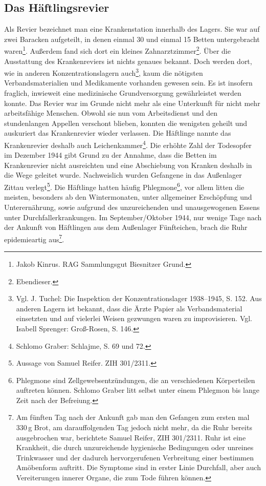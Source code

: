 \documentclass[a4paper,12pt,ngerman,
]{nisebook}
\begin{document}
\subsection{Das Häftlingsrevier}
\label{krank}
Als Revier bezeichnet man eine Krankenstation innerhalb des Lagers. Sie war auf zwei Baracken aufgeteilt, in denen einmal 30 und einmal 15 Betten untergebracht waren\footnote{Jakob Kinrus. RAG Sammlungsgut Biesnitzer Grund.}. Außerdem fand sich dort ein kleines Zahnarztzimmer\footnote{Ebendieser.}. Über die Ausstattung des Krankenreviers ist nichts genaues bekannt. Doch werden dort, wie in anderen Konzentrationslagern auch\footnote{Vgl. J. Tuchel: Die Inspektion der Konzentrationslager 1938--1945, S. 152. Aus anderen Lagern ist bekannt, dass die Ärzte Papier als Verbandsmaterial einsetzten und auf vielerlei Weisen gezwungen waren zu improvisieren. Vgl. Isabell Sprenger: Groß-Rosen, S. 146.}, kaum die nötigsten Verbandsmaterialien und Medikamente vorhanden gewesen sein. Es ist insofern fraglich, inwieweit eine medizinische Grundversorgung gewährleistet werden konnte.
\newline
Das Revier war im Grunde nicht mehr als eine Unterkunft für nicht mehr arbeitsfähige Menschen. Obwohl sie nun vom Arbeitsdienst und den stundenlangen Appellen verschont blieben, konnten die wenigsten geheilt und auskuriert das Krankenrevier wieder verlassen. Die Häftlinge nannte das Krankenrevier deshalb auch \glqq Leichenkammer\grqq\footnote{Schlomo Graber: Schlajme, S. 69 und 72.}.
Die erhöhte Zahl der Todesopfer im Dezember 1944 gibt Grund zu der Annahme, dass die Betten im Krankenrevier nicht ausreichten und eine Abschiebung von Kranken deshalb in die Wege geleitet wurde. Nachweislich wurden Gefangene in das Außenlager Zittau verlegt\footnote{Aussage von Samuel Reifer. ZIH 301/2311.}.\newline
Die Häftlinge hatten häufig Phlegmone\footnote{Phlegmone sind Zellgewebsentzündungen, die an verschiedenen Körperteilen auftreten können. Schlomo Graber litt selbst unter einem Phlegmon bis lange Zeit nach der Befreiung.}, vor allem litten die meisten, besonders ab den Wintermonaten, unter allgemeiner Erschöpfung und Unterernährung, sowie aufgrund des unzureichenden und unausgewogenen Essens unter Durchfallerkrankungen. Im September/Oktober 1944, nur wenige Tage nach der Ankunft von Häftlingen aus dem Außenlager Fünfteichen, brach die Ruhr epidemieartig aus\footnote{Am fünften Tag nach der Ankunft gab man den Gefangen zum ersten mal 330\,g Brot, am darauffolgenden Tag jedoch nicht mehr, da die Ruhr bereits ausgebrochen war, berichtete Samuel Reifer, ZIH 301/2311. Ruhr ist eine Krankheit, die durch unzureichende hygienische Bedingungen oder unreines Trinkwasser und der dadurch hervorgerufenen Verbreitung einer bestimmen Amöbenform auftritt. Die Symptome sind in erster Linie Durchfall, aber auch Vereiterungen innerer Organe, die zum Tode führen können.}.
\end{document}
